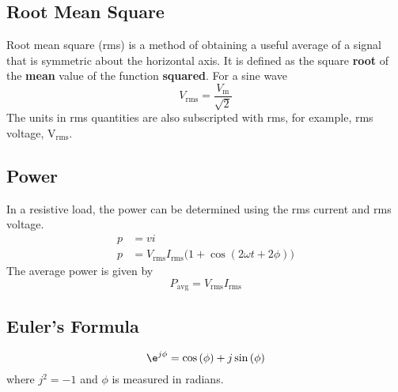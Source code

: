 \documentclass{article}
\begin{document}
\subsection{Root Mean Square}
\begin{definition}
    Root mean square (rms) is a method of obtaining a useful average of a signal that is symmetric about
    the horizontal axis. It is defined as the square \textbf{root} of the \textbf{mean} value of the
    function \textbf{squared}.
    For a sine wave
    \begin{equation*}
        V_{\mathrm{rms}} = \frac{V_{\mathrm{m}}}{\sqrt{2}}
    \end{equation*}
    The units in rms quantities are also subscripted with rms, for example, rms voltage, $\si{\volt}_{\mathrm{rms}}$.
\end{definition}
\subsection{Power}
\begin{definition}
    In a resistive load, the power can be determined using the rms current and rms voltage.
    \begin{align*}
        p & = vi                                                                                                                       \\
        p & = V_{\mathrm{rms}}I_{\mathrm{rms}}\bigl( 1 + \cos{\left( 2 \omega t + 2 \phi \right)} \bigr)
    \end{align*}
    The average power is given by
    \begin{equation*}
        P_{\mathrm{avg}} = V_{\mathrm{rms}}I_{\mathrm{rms}}
    \end{equation*}
\end{definition}
\subsection{Euler's Formula}
\begin{theorem}\label{theorem:eulers_formula}
    \begin{equation*}
        \e^{j\phi} = \cos{\left( \phi \right)} + j \sin{\left( \phi \right)}
    \end{equation*}
    where $j^2 = -1$ and $\phi$ is measured in radians.
\end{theorem}
\end{document}
